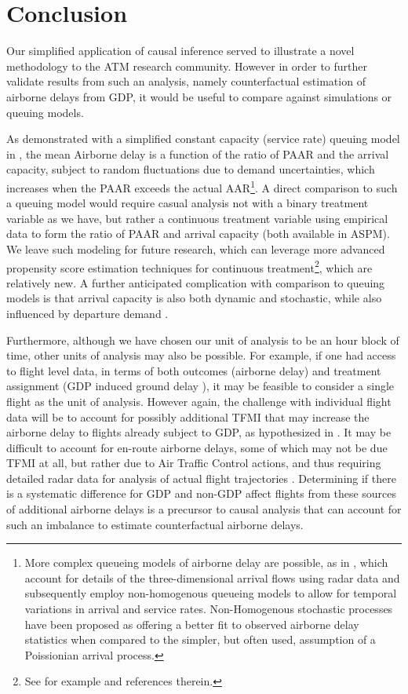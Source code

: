 \documentclass[conference]{IEEEtran}
\begin{document}
% 

\section{Conclusion}
Our simplified application of causal inference served to illustrate a novel methodology to the ATM research community.  However in order to further validate results from such an analysis, namely counterfactual estimation of airborne delays from GDP, it would be useful to compare against simulations or queuing models.    

As demonstrated with a simplified constant capacity (service rate) queuing model in \cite{ball2001analysis}, the mean Airborne delay is a function of the ratio of PAAR and the arrival capacity,  subject to random fluctuations due to demand uncertainties, which increases when the PAAR exceeds the actual AAR\footnote{More complex queueing models of airborne delay are possible, as in \cite{gwiggner2014data}, which account for details of the three-dimensional arrival flows using radar data and subsequently employ non-homogenous queueing models to allow for temporal variations in arrival and service rates.  Non-Homogenous stochastic processes have been proposed as offering a better fit to observed airborne delay statistics \cite{caccavale2014model} when compared to the simpler, but often used, assumption of a Poissionian arrival process.}.  A direct comparison to such a queuing model would require casual analysis not with a binary treatment variable as we have, but rather a continuous treatment variable using empirical data to form the ratio of PAAR and arrival capacity (both available in ASPM).  We leave such modeling for future research, which can leverage more advanced propensity score estimation techniques for continuous treatment\footnote{See for example \cite{fong2017covariate} and references therein.}, which are relatively new.   A further anticipated complication with comparison to queuing models is that arrival capacity is also both dynamic and stochastic, while also influenced by departure demand \cite{jacquillat2015endogenous}. 

Furthermore, although we have chosen our unit of analysis to be an hour block of time, other units of analysis may also be possible.  For example, if one had access to flight level data, in terms of both outcomes (airborne delay) and treatment assignment (GDP induced ground delay ), it may be feasible to consider a single flight as the unit of analysis.  However again, the challenge with individual flight data will be to account for possibly additional TFMI that may increase the airborne delay to flights already subject to GDP, as hypothesized in \cite{bilimoria2016analysis}.  It may be difficult to account for en-route airborne delays, some of which may not be due TFMI at all, but rather due to Air Traffic Control actions, and thus requiring detailed radar data for analysis of actual flight trajectories \cite{belkoura2016generation}.  Determining if there is a systematic difference for GDP and non-GDP affect flights from these sources of additional airborne delays is a precursor to causal analysis that can account for such an imbalance to estimate counterfactual airborne delays.  
\end{document}
